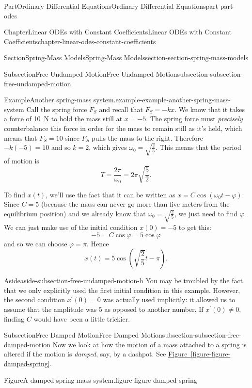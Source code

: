 \documentclass[twoside,10pt,]{book}
\newcommand{\xreffont}{\relax}
\numberwithin{equation}{part}
\begin{document}
\begin{partptx}{Part}{Ordinary Differential Equations}{}{Ordinary Differential Equations}{}{}{part-part-odes}
\begin{chapterptx}{Chapter}{Linear ODEs with Constant Coefficients}{}{Linear ODEs with Constant Coefficients}{}{}{chapter-linear-odes-constant-coefficients}
\begin{sectionptx}{Section}{Spring-Mass Models}{}{Spring-Mass Models}{}{}{section-section-spring-mass-models}
\begin{subsectionptx}{Subsection}{Free Undamped Motion}{}{Free Undamped Motion}{}{}{subsection-subsection-free-undamped-motion}
\begin{example}{Example}{Another spring-mass system.}{example-example-another-spring-mass-system}
Call the spring force \(F_{S}\) and recall that \(F_{S} = -kx\). We know that it takes a force of \SI{10}{\newton} to hold the mass still at \(x=-5\). The spring force must \emph{precisely} counterbalance this force in order for the mass to remain still as it's held, which means that \(F_{S} = 10\) since \(F_{S}\) pulls the mass to the right. Therefore \(-k(-5) = 10\) and so \(k=2\), which gives \(\omega_{0} = \sqrt{\frac{2}{5}}\). This means that the period of motion is%
\begin{equation*}
T = \frac{2\pi}{\omega_{0}} = 2\pi\sqrt{\frac{5}{2}}.
\end{equation*}
%
\par
To find \(x(t)\), we'll use the fact that it can be written as \(x = C\cos(\omega_{0}t-\varphi)\). Since \(C = 5\) (because the mass can never go more than five meters from the equilibrium position) and we already know that \(\omega_{0} = \sqrt{\frac{2}{5}}\), we just need to find \(\varphi\). We can just make use of the initial condition \(x(0) = -5\) to get this:%
\begin{equation*}
-5 = C\cos\varphi = 5\cos\varphi
\end{equation*}
and so we can choose \(\varphi=\pi\). Hence%
\begin{equation*}
x(t) = 5\cos(\sqrt{\frac{2}{5}}t-\pi).
\end{equation*}
%
\end{example}
\begin{aside}{Aside}{}{aside-subsection-free-undamped-motion-h}%
You may be troubled by the fact that we only explicitly used the first initial condition in this example. However, the second condition \(x^\prime(0) = 0\) was actually used implicitly: it allowed us to assume that the amplitude was \(5\) as opposed to another number. If \(x^\prime(0)\neq0\), finding \(C\) would have been a little trickier.%
\end{aside}
\end{subsectionptx}
%
%
\typeout{************************************************}
\typeout{************************************************}
%
\begin{subsectionptx}{Subsection}{Free Damped Motion}{}{Free Damped Motion}{}{}{subsection-subsection-free-damped-motion}
Now we look at how the motion of a mass attached to a spring is altered if the motion is \emph{damped}, say, by a dashpot. See \hyperref[figure-figure-damped-spring]{Figure~{\xreffont\ref{figure-figure-damped-spring}}}.%
\begin{figureptx}{Figure}{A damped spring-mass system.}{figure-figure-damped-spring}{}%

\end{figureptx}
\end{subsectionptx}
\end{sectionptx}
\end{chapterptx}
\end{partptx}
\end{document}
